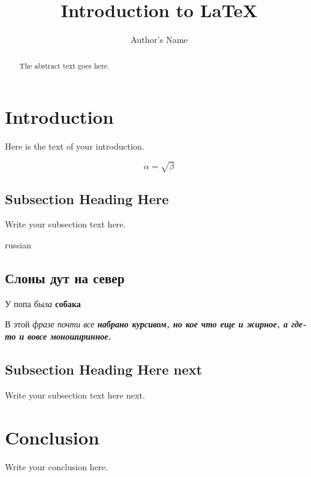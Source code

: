 \documentclass[oneside,final,14pt]{extreport}
\begin{document}
\title{Introduction to \LaTeX{}}
\author{Author's Name}

\maketitle

\begin{abstract}
The abstract text goes here.
\end{abstract}

\section{Introduction}
Here is the text of your introduction.

\begin{equation}
    \label{simple_equation}
    \alpha = \sqrt{ \beta }
\end{equation}

\subsection{Subsection Heading Here}
Write your subsection text here.

\begin{otherlanguage*}{russian}
\subsection{Слоны дут на север}
У попа {\it была} {\bf собака}

В этой \itshape фразе почти все \bfseries 
набрано курсивом, \ttfamily но кое что
\upshape еще и жирное, \rmfamily а где-то
и вовсе \mdseries моноширинное.

\end{otherlanguage*}

\subsection{Subsection Heading Here next}
Write your subsection text here next.

\section{Conclusion}
Write your conclusion here.
\end{document}
